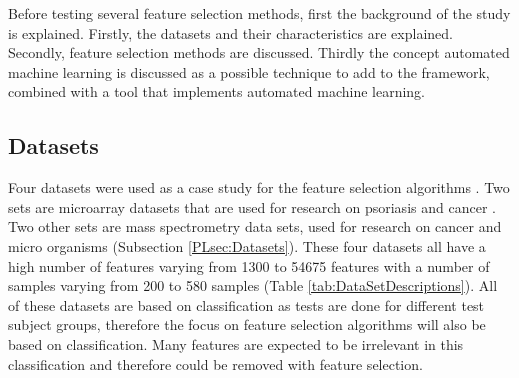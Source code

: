 \documentclass[10pt,a4paper]{report}
\begin{document}
	Before testing several feature selection methods, first the background of the study is explained. Firstly, the datasets and their characteristics are explained. Secondly, feature selection methods are discussed. Thirdly the concept automated machine learning is discussed as a possible technique to add to the framework, combined with a tool that implements automated machine learning.
	
	\subsection{Datasets}
	\label{FSsubsec:Datasets}
	
	Four datasets were used as a case study for the feature selection algorithms . Two sets are microarray datasets that are used for research on psoriasis \cite{nair2009genome, suarez2012expanding, bigler2013cross, yao2008type} and cancer \cite{wojnarski2010rsctc}. Two other sets are mass spectrometry data sets, used for research on cancer \cite{NIPS2004_2728} and micro organisms \cite{doi:10.1093/bioinformatics/btu022} (Subsection \ref{PLsec:Datasets}). These four datasets all have a high number of features varying from 1300 to 54675 features with a number of samples varying from 200 to 580 samples (Table \ref{tab:DataSetDescriptions}). All of these datasets are based on classification as tests are done for different test subject groups, therefore the focus on feature selection algorithms will also be based on classification. Many features are expected to be irrelevant in this classification and therefore could be removed with feature selection.	
\end{document}
